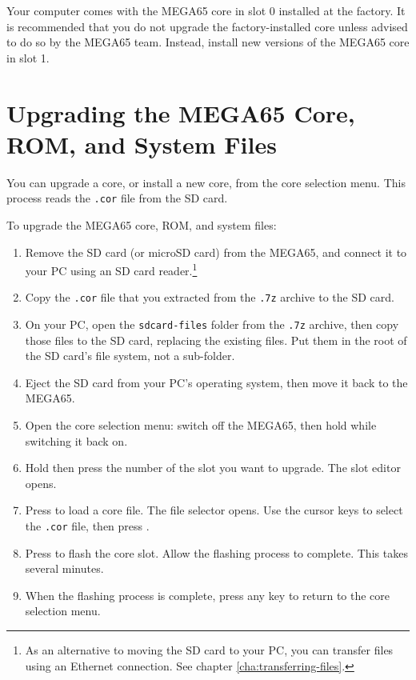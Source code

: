 Your computer comes with the MEGA65 core in slot 0 installed at the factory. It is recommended that you do not upgrade the factory-installed core unless advised to do so by the MEGA65 team. Instead, install new versions of the MEGA65 core in slot 1.

\section{Upgrading the MEGA65 Core, ROM, and System Files}

You can upgrade a core, or install a new core, from the core selection menu. This process reads the {\tt .cor} file from the SD card.

To upgrade the MEGA65 core, ROM, and system files:

\begin{enumerate}
  \item Remove the SD card (or microSD card) from the MEGA65, and connect it to your PC using an SD card reader.\footnote{As an alternative to moving the SD card to your PC, you can transfer files using an Ethernet connection. See chapter \vref{cha:transferring-files}.}
  \item Copy the {\tt .cor} file that you extracted from the {\tt .7z} archive to the SD card.
  \item On your PC, open the {\tt sdcard-files} folder from the {\tt .7z} archive, then copy those files to the SD card, replacing the existing files. Put them in the root of the SD card's file system, not a sub-folder.
  \item Eject the SD card from your PC's operating system, then move it back to the MEGA65.
  \item Open the core selection menu: switch off the MEGA65, then hold  while switching it back on.
  \item Hold  then press the number of the slot you want to upgrade. The slot editor opens.
  \item Press  to load a core file. The file selector opens. Use the cursor keys to select the {\tt .cor} file, then press .
  \item Press  to flash the core slot. Allow the flashing process to complete. This takes several minutes.
  \item When the flashing process is complete, press any key to return to the core selection menu.
\end{enumerate}

